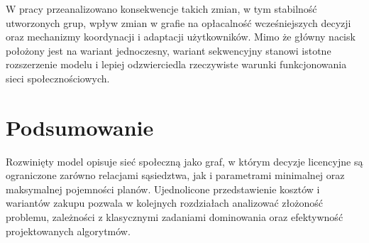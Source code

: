 W pracy przeanalizowano konsekwencje takich zmian, w tym stabilność utworzonych grup, wpływ zmian w grafie na opłacalność wcześniejszych decyzji oraz mechanizmy koordynacji i adaptacji użytkowników. Mimo że główny nacisk położony jest na wariant jednoczesny, wariant sekwencyjny stanowi istotne rozszerzenie modelu i lepiej odzwierciedla rzeczywiste warunki funkcjonowania sieci społecznościowych.

\section{Podsumowanie}

Rozwinięty model opisuje sieć społeczną jako graf, w którym decyzje licencyjne są ograniczone zarówno relacjami sąsiedztwa, jak i parametrami minimalnej oraz maksymalnej pojemności planów. Ujednolicone przedstawienie kosztów i wariantów zakupu pozwala w kolejnych rozdziałach analizować złożoność problemu, zależności z klasycznymi zadaniami dominowania oraz efektywność projektowanych algorytmów.
